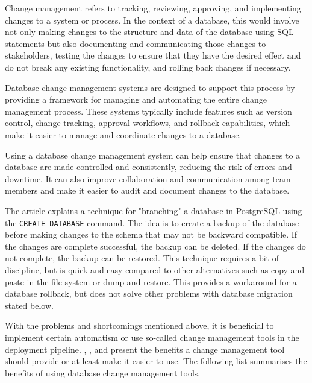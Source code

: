 Change management refers to tracking, reviewing, approving, and implementing changes to a system or process. In the context of a database, this would involve not only making changes to the structure and data of the database using SQL statements but also documenting and communicating those changes to stakeholders, testing the changes to ensure that they have the desired effect and do not break any existing functionality, and rolling back changes if necessary.

Database change management systems are designed to support this process by providing a framework for managing and automating the entire change management process. These systems typically include features such as version control, change tracking, approval workflows, and rollback capabilities, which make it easier to manage and coordinate changes to a database.

Using a database change management system can help ensure that changes to a database are made controlled and consistently, reducing the risk of errors and downtime. It can also improve collaboration and communication among team members and make it easier to audit and document changes to the database.

The article \cite{Prochazka2022} explains a technique for "branching" a database in PostgreSQL using the \texttt{CREATE DATABASE} command. The idea is to create a backup of the database before making changes to the schema that may not be backward compatible. If the changes are complete successful, the backup can be deleted. If the changes do not complete, the backup can be restored. This technique requires a bit of discipline, but is quick and easy compared to other alternatives such as copy and paste in the file system or dump and restore. This provides a workaround for a database rollback, but does not solve other problems with database migration stated below.

 
%
With the problems and shortcomings mentioned above, it is beneficial to implement certain automatism or use so-called change management tools in the deployment pipeline.
\cite{Dillon2022}, \cite{Robles2021}, and \cite{Fritchey2022} present the benefits a change management tool should provide or at least make it easier to use. The following list summarises the benefits of using database change management tools.

